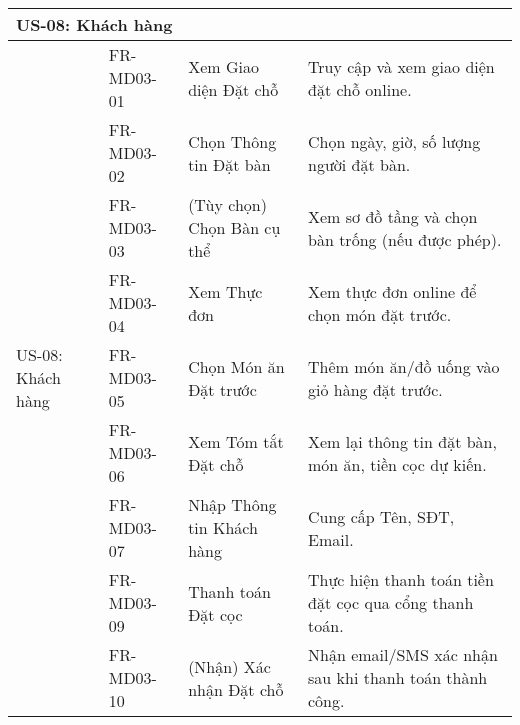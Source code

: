 \begin{longtable}{|m{2.5cm}|m{2.5cm}|m{5cm}|m{5cm}|}
	\multicolumn{4}{|l|}{\textbf{US-08: Khách hàng}}                                                                                                                                                                                       \\ \hline
	\multirow{9}{=}[2pt]{US-08: Khách hàng}                 & FR-MD03-01            & Xem Giao diện Đặt chỗ                                  & Truy cập và xem giao diện đặt chỗ online.                                                   \\
	                                                        & FR-MD03-02            & Chọn Thông tin Đặt bàn                                 & Chọn ngày, giờ, số lượng người đặt bàn.                                                     \\
	                                                        & FR-MD03-03            & (Tùy chọn) Chọn Bàn cụ thể                             & Xem sơ đồ tầng và chọn bàn trống (nếu được phép).                                           \\
	                                                        & FR-MD03-04            & Xem Thực đơn                                           & Xem thực đơn online để chọn món đặt trước.                                                  \\
	                                                        & FR-MD03-05            & Chọn Món ăn Đặt trước                                  & Thêm món ăn/đồ uống vào giỏ hàng đặt trước.                                                 \\
	                                                        & FR-MD03-06            & Xem Tóm tắt Đặt chỗ                                    & Xem lại thông tin đặt bàn, món ăn, tiền cọc dự kiến.                                        \\
	                                                        & FR-MD03-07            & Nhập Thông tin Khách hàng                              & Cung cấp Tên, SĐT, Email.                                                                   \\
	                                                        & FR-MD03-09            & Thanh toán Đặt cọc                                     & Thực hiện thanh toán tiền đặt cọc qua cổng thanh toán.                                      \\
	                                                        & FR-MD03-10            & (Nhận) Xác nhận Đặt chỗ                                & Nhận email/SMS xác nhận sau khi thanh toán thành công.                                      \\

\end{longtable}
